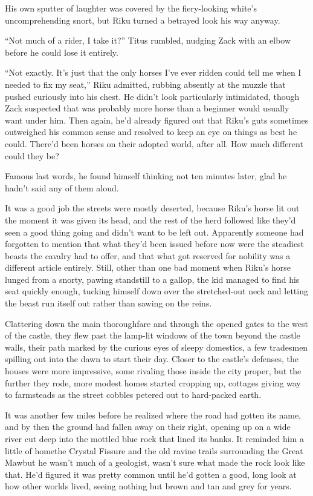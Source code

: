 His own sputter of laughter was covered by the fiery-looking white's uncomprehending snort, but Riku turned a betrayed look his way anyway.

``Not much of a rider, I take it?'' Titus rumbled, nudging Zack with an elbow before he could lose it entirely.

``Not exactly. It's just that the only horses I've ever ridden could tell me when I needed to fix my seat,'' Riku admitted, rubbing absently at the muzzle that pushed curiously into his chest. He didn't look particularly intimidated, though Zack suspected that was probably more horse than a beginner would usually want under him. Then again, he'd already figured out that Riku's guts sometimes outweighed his common sense and resolved to keep an eye on things as best he could. There'd been horses on their adopted world, after all. How much different could they be?

Famous last words, he found himself thinking not ten minutes later, glad he hadn't said any of them aloud.

It was a good job the streets were mostly deserted, because Riku's horse lit out the moment it was given its head, and the rest of the herd followed like they'd seen a good thing going and didn't want to be left out. Apparently someone had forgotten to mention that what they'd been issued before now were the steadiest beasts the cavalry had to offer, and that what got reserved for nobility was a different article entirely. Still, other than one bad moment when Riku's horse lunged from a snorty, pawing standstill to a gallop, the kid managed to find his seat quickly enough, tucking himself down over the stretched-out neck and letting the beast run itself out rather than sawing on the reins.

Clattering down the main thoroughfare and through the opened gates to the west of the castle, they flew past the lamp-lit windows of the town beyond the castle walls, their path marked by the curious eyes of sleepy domestics, a few tradesmen spilling out into the dawn to start their day. Closer to the castle's defenses, the houses were more impressive, some rivaling those inside the city proper, but the further they rode, more modest homes started cropping up, cottages giving way to farmsteads as the street cobbles petered out to hard-packed earth.

It was another few miles before he realized where the road had gotten its name, and by then the ground had fallen away on their right, opening up on a wide river cut deep into the mottled blue rock that lined its banks. It reminded him a little of home\textemdash the Crystal Fissure and the old ravine trails surrounding the Great Maw\textemdash but he wasn't much of a geologist, wasn't sure what made the rock look like that. He'd figured it was pretty common until he'd gotten a good, long look at how other worlds lived, seeing nothing but brown and tan and grey for years.

